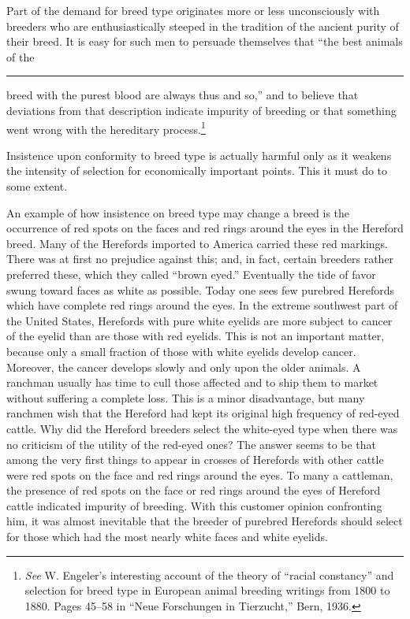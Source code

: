 Part of the demand for breed type originates more or less unconsciously
with breeders who are enthusiastically steeped in the tradition
of the ancient purity of their breed. It is easy for such men to persuade
themselves that ``the best animals of the \rule[2.25pt]{2.54cm}{0.5pt} breed with the
purest blood are always thus and so,'' and to believe that deviations
from that description indicate impurity of breeding or that something
went wrong with the hereditary process.\footnote{\textit{See} W.
Engeler's interesting account of the theory of ``racial constancy'' and
selection for breed type in European animal breeding writings from 1800 to
1880. Pages 45--58 in ``Neue Forschungen in Tierzucht,'' Bern, 1936.}
\noclub

Insistence upon conformity to breed type is actually harmful only as
it weakens the intensity of selection for economically important points.
This it must do to some extent.

An example of how insistence on breed type may change a breed is
the occurrence of red spots on the faces and red rings around the eyes in
the Hereford breed. Many of the Herefords imported to America carried
these red markings. There was at first no prejudice against this;
and, in fact, certain breeders rather preferred these, which they called
``brown eyed.'' Eventually the tide of favor swung toward faces as white
as possible. Today one sees few purebred Herefords which have complete
red rings around the eyes. In the extreme southwest part of the
United States, Herefords with pure white eyelids are more subject to
cancer of the eyelid than are those with red eyelids. This is not an
important matter, because only a small fraction of those with white
eyelids develop cancer. Moreover, the cancer develops slowly and only
upon the older animals. A ranchman usually has time to cull those
affected and to ship them to market without suffering a complete loss.
This is a minor disadvantage, but many ranchmen wish that the Hereford
had kept its original high frequency of red-eyed cattle. Why did
the Hereford breeders select the white-eyed type when there was no
criticism of the utility of the red-eyed ones? The answer seems to be that
among the very first things to appear in crosses of Herefords with other
cattle were red spots on the face and red rings around the eyes. To many
a cattleman, the presence of red spots on the face or red rings around
the eyes of Hereford cattle indicated impurity of breeding. With this
customer opinion confronting him, it was almost inevitable that the
breeder of purebred Herefords should select for those which had the
most nearly white faces and white eyelids.


